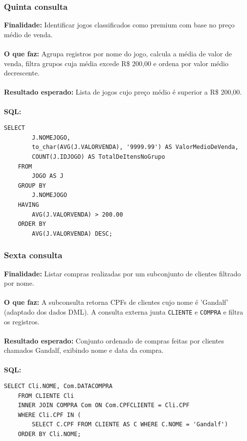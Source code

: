 \documentclass[11pt]{article}
\begin{document}
\subsubsection{Quinta consulta}
\textbf{Finalidade:} Identificar jogos classificados como premium com base no preço médio de venda.\\\\
\textbf{O que faz:} Agrupa registros por nome do jogo, calcula a média de valor de venda, filtra grupos cuja média excede R\$ 200,00 e ordena por valor médio decrescente.\\\\
\textbf{Resultado esperado:} Lista de jogos cujo preço médio é superior a R\$ 200,00.\\\\
\textbf{SQL:}
    \begin{Verbatim}[breaklines=true, breakanywhere=true]
    SELECT
        J.NOMEJOGO,                                   
        to_char(AVG(J.VALORVENDA), '9999.99') AS ValorMedioDeVenda,        
        COUNT(J.IDJOGO) AS TotalDeItensNoGrupo         
    FROM
        JOGO AS J
    GROUP BY
        J.NOMEJOGO                                     
    HAVING
        AVG(J.VALORVENDA) > 200.00                    
    ORDER BY
        AVG(J.VALORVENDA) DESC;
    \end{Verbatim}

\subsubsection{Sexta consulta}
\textbf{Finalidade:} Listar compras realizadas por um subconjunto de clientes filtrado por nome.\\\\
\textbf{O que faz:} A subconsulta retorna CPFs de clientes cujo nome é 'Gandalf' (adaptado dos dados DML). A consulta externa junta \texttt{CLIENTE} e \texttt{COMPRA} e filtra os registros.\\\\
\textbf{Resultado esperado:} Conjunto ordenado de compras feitas por clientes chamados Gandalf, exibindo nome e data da compra.\\\\
\textbf{SQL:}
    \begin{Verbatim}[breaklines=true, breakanywhere=true]
    SELECT Cli.NOME, Com.DATACOMPRA
    FROM CLIENTE Cli
    INNER JOIN COMPRA Com ON Com.CPFCLIENTE = Cli.CPF
    WHERE Cli.CPF IN (
        SELECT C.CPF FROM CLIENTE AS C WHERE C.NOME = 'Gandalf')
    ORDER BY Cli.NOME;
    \end{Verbatim}
\end{document}
